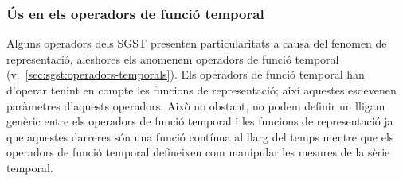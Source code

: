 







\subsubsection{Ús en els operadors de funció temporal}
\label{sec:sgst:repr-intervaltemporal}

Alguns operadors dels \gls{SGST} presenten particularitats a causa del
fenomen de representació, aleshores els anomenem operadors de funció
temporal (v.\ \autoref{sec:sgst:operadors-temporals}).
Els operadors de funció temporal han d'operar tenint en compte les
funcions de representació; així aquestes esdevenen paràmetres
d'aquests operadors. Això no obstant, no podem definir un lligam
genèric entre els operadors de funció temporal i les funcions de
representació ja que aquestes darreres són una funció contínua al llarg del
temps mentre que els operadors de funció temporal defineixen com
manipular les mesures de la sèrie temporal.

